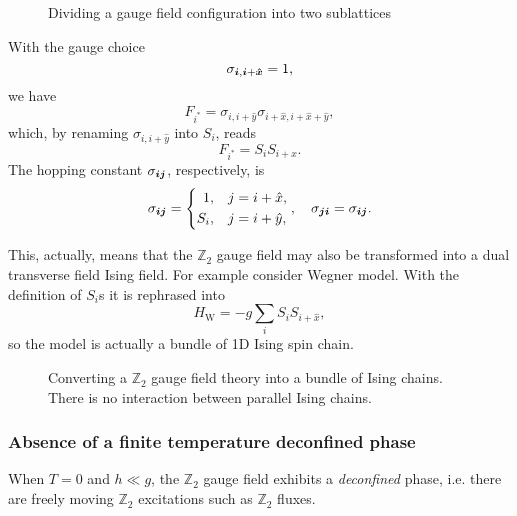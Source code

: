 \documentclass[hyperref, a4paper]{article}
\begin{document}
\begin{figure}
    \centering
    
    \caption{Dividing a gauge field configuration into two sublattices}
\end{figure}

With the gauge choice
\begin{equation}
    \sigma_{\vb*{i}, \vb*{i}+\vu*{x}} = 1,
    \label{eq:gauge-choice}
\end{equation}
we have
\begin{equation}
    F_{i^*} = \sigma_{i, i+\hat{y}} \sigma_{i+\hat{x}, i + \hat{x} + \hat{y}},
\end{equation}
which, by renaming $\sigma_{i, i+\hat{y}}$ into $S_i$, reads 
\begin{equation}
    F_{i^*} = S_i S_{i+\hat{x}}.
\end{equation}
The hopping constant $\sigma_{\vb*{i} \vb*{j}}$, respectively, is
\begin{equation}
    \sigma_{\vb*{i} \vb*{j}} = \left\{
    \begin{aligned}
        1, &\quad j = i + \hat{x}, \\
        S_i, &\quad j = i + \hat{y},
    \end{aligned}
\right., \quad \sigma_{\vb*{j} \vb*{i}} = \sigma_{\vb*{i} \vb*{j}}.
\end{equation}

This, actually, means that the $\mathbb{Z}_2$ gauge field may also be transformed into a dual transverse field Ising field.
For example consider Wegner model.
With the definition of $S_i$s it is rephrased into
\begin{equation}
    H_\text{W} = -g \sum_i S_i S_{i+\hat{x}},
\end{equation}
so the model is actually a bundle of 1D Ising spin chain.

\begin{figure}
    \centering
    
    \caption{Converting a $\mathbb{Z}_2$ gauge field theory into a bundle of Ising chains. There is no interaction between parallel Ising chains.}
\end{figure}

\subsubsection{Absence of a finite temperature deconfined phase}

When $T=0$ and $h \ll g$, the $\mathbb{Z}_2$ gauge field exhibits a \emph{deconfined} phase, i.e. there are freely moving $\mathbb{Z}_2$ excitations such as $\mathbb{Z}_2$ fluxes.
\end{document}
